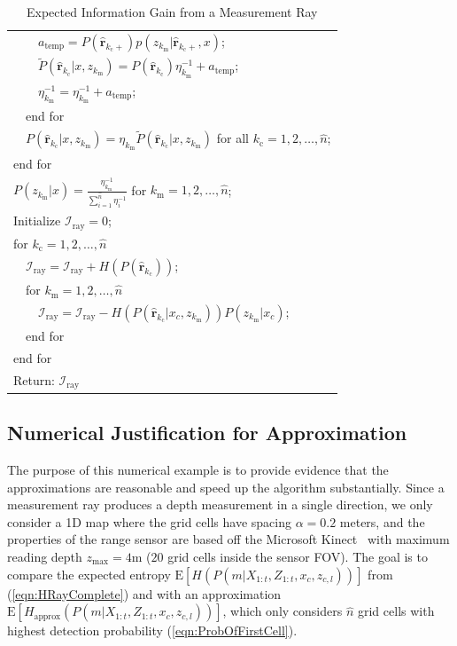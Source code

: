 \documentclass[letterpaper, 10pt]{ieeeconf}
\newcommand{\refeqn}[1]{(\ref{eqn:#1})}
\begin{document}
\begin{table}
\begin{tabular}{ l }
   \ \ \ \ $a_\text{temp}=P(\hat{\mathbf{r}}_{k_\text{c}+})p(z_{k_\text{m}}|\hat{\mathbf{r}}_{k_\text{c}+},x)$;\\
   \ \ \ \ $\tilde P(\hat{\mathbf{r}}_{k_\text{c}}|x,z_{k_\text{m}})=P(\hat{\mathbf{r}}_{k_\text{c}})\eta^{-1}_{k_\text{m}}+a_\text{temp}$;\\
   \ \ \ \ $\eta^{-1}_{k_\text{m}}=\eta^{-1}_{k_\text{m}}+a_\text{temp}$;\\
   \ \ end for\\
   \ \ $P(\hat{\mathbf{r}}_{k_\text{c}}|x,z_{k_\text{m}})=\eta_{k_\text{m}}\tilde P(\hat{\mathbf{r}}_{k_\text{c}}|x,z_{k_\text{m}})$ for all $k_\text{c}=1,2,\ldots,\hat n$;\\
   end for\\ 
   $P(z_{k_\text{m}}|x)=\frac{\eta^{-1}_{k_\text{m}}}{\sum_{i=1}^{\hat n}\eta^{-1}_{i}}$ for $k_\text{m}=1,2,\ldots,\hat n$;\\
   
   Initialize $\mathcal I_\text{ray}=0$;\\
   for $k_\text{c}=1,2,\ldots,\hat n$\\
   \ \ $\mathcal I_\text{ray}=\mathcal I_\text{ray}+H(P(\hat{\mathbf{r}}_{k_\text{c}}))$;\\
   \ \ for $k_\text{m}=1,2,\ldots,\hat n$\\
   \ \ \ \ $\mathcal I_\text{ray} = \mathcal I_\text{ray}-H(P(\hat{\mathbf{r}}_{k_\text{c}}|x_c,z_{k_\text{m}}))P(z_{k_\text{m}}|x_{c})$;\\
   \ \ end for\\
  end for\\
  Return: $\mathcal I_\text{ray}$\\
\end{tabular}
\caption{Expected Information Gain from a Measurement Ray}
\label{tab:RayExpectedEntropyGain}
\end{table}



\subsection{Numerical Justification for Approximation}

The purpose of this numerical example is to provide evidence that the approximations are reasonable and speed up the algorithm substantially.
Since a measurement ray produces a depth measurement in a single direction, we only consider a 1D map where the grid cells have spacing $\alpha=0.2$ meters, and the properties of the range sensor are based off the Microsoft Kinect~\cite{PirRutBisSch11,KhoElb12} with maximum reading depth $z_\text{max}=4$m ($20$ grid cells inside the sensor FOV). The goal is to compare the expected entropy $\text{E}[H(P(m|X_{1:t},Z_{1:t},x_c,z_{c,l}))]$ from \refeqn{HRayComplete} and with an approximation $\text{E}[H_\text{approx}(P(m|X_{1:t},Z_{1:t},x_c,z_{c,l}))]$, which only considers $\hat n$ grid cells with highest detection probability \refeqn{ProbOfFirstCell}.
\end{document}

